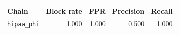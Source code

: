 \begin{tabular}{lrrrr}
\toprule
Chain & Block rate & FPR & Precision & Recall \\
\midrule
\texttt{hipaa\_phi} & 1.000 & 1.000 & 0.500 & 1.000 \\
\bottomrule
\end{tabular}
